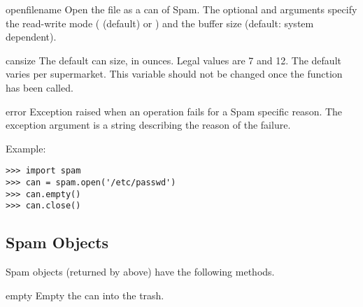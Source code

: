 \begin{funcdesc}{open}{filename}
Open the file  as a can of Spam.  The optional
 and  arguments specify the read-write mode
( (default) or ) and the buffer size (default:
system dependent).
\end{funcdesc}


\begin{datadesc}{cansize}
The default can size, in ounces.  Legal values are 7 and 12.  The
default varies per supermarket.  This variable should not be changed
once the  function has been called.
\end{datadesc}


\begin{excdesc}{error}
Exception raised when an operation fails for a Spam specific reason.
The exception argument is a string describing the reason of the
failure.
\end{excdesc}




Example:

\bcode\begin{verbatim}
>>> import spam
>>> can = spam.open('/etc/passwd')
>>> can.empty()
>>> can.close()
\end{verbatim}\ecode
%

\subsection{Spam Objects}

Spam objects (returned by  above) have the following
methods.

\renewcommand{\indexsubitem}{(spam method)}

\begin{funcdesc}{empty}{}
Empty the can into the trash.
\end{funcdesc}
